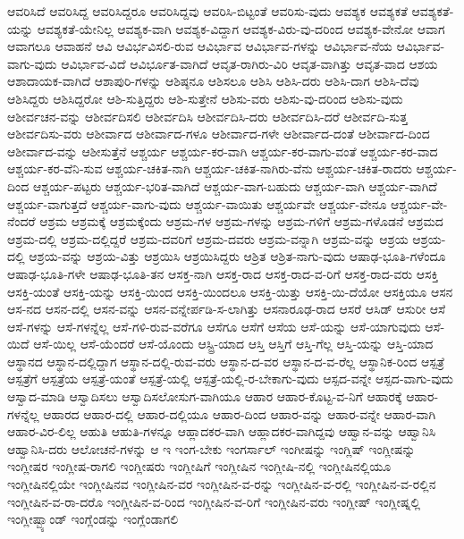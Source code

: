 {ಆವರಿಸಿದೆ
ಆವರಿಸಿದ್ದ
ಆವರಿಸಿದ್ದರೂ
ಆವರಿಸಿದ್ದವು
ಆವರಿಸಿ-ಬಿಟ್ಟಂತೆ
ಆವರಿಸು-ವುದು
ಆವಶ್ಯಕ
ಆವಶ್ಯಕತೆ
ಆವಶ್ಯಕತೆ-ಯನ್ನು
ಆವಶ್ಯಕತೆ-ಯೇನಿಲ್ಲ
ಆವಶ್ಯಕ-ವಾಗಿ
ಆವಶ್ಯಕ-ವಿದ್ದಾಗ
ಆವಶ್ಯಕ-ವಿರು-ವು-ದರಿಂದ
ಆವಶ್ಯಕ-ವೇನೋ
ಆವಾಗ
ಆವಾಗಲೂ
ಆವಾಹನೆ
ಆವಿ
ಆವಿರ್ಭವಿಸಲಿ-ರುವ
ಆವಿರ್ಭಾವ
ಆವಿರ್ಭಾವ-ಗಳನ್ನು
ಆವಿರ್ಭಾವ-ನೆಯ
ಆವಿರ್ಭಾವ-ವಾಗು-ವುದು
ಆವಿರ್ಭಾವ-ವಿದೆ
ಆವಿರ್ಭೂತ-ವಾಗಿದೆ
ಆವೃತ-ರಾಗಿರು-ವಿರಿ
ಆವೃತ-ವಾಗಿತ್ತು
ಆವೃತ-ವಾದ
ಆಶಯ
ಆಶಾದಾಯಕ-ವಾಗಿದೆ
ಆಶಾಪುರಿ-ಗಳನ್ನು
ಆಶಿಷ್ಠನೂ
ಆಶಿಸಲೂ
ಆಶಿಸಿ
ಆಶಿಸಿ-ದರು
ಆಶಿಸಿ-ದಾಗ
ಆಶಿಸಿ-ದೆವು
ಆಶಿಸಿದ್ದರು
ಆಶಿಸಿದ್ದರೋ
ಆಶಿ-ಸುತ್ತಿದ್ದರು
ಆಶಿ-ಸುತ್ತೇನೆ
ಆಶಿಸು-ವರು
ಆಶಿಸು-ವು-ದರಿಂದ
ಆಶಿಸು-ವುದು
ಆಶೀರ್ವಚನ-ವನ್ನು
ಆಶೀರ್ವದಿಸಲಿ
ಆಶೀರ್ವದಿಸಿ
ಆಶೀರ್ವದಿಸಿ-ದರು
ಆಶೀರ್ವದಿಸಿ-ದರೆ
ಆಶೀರ್ವದಿ-ಸುತ್ತ
ಆಶೀರ್ವದಿಸು-ವರು
ಆಶೀರ್ವಾದ
ಆಶೀರ್ವಾದ-ಗಳೂ
ಆಶೀರ್ವಾದ-ಗಳೇ
ಆಶೀರ್ವಾದ-ದಂತೆ
ಆಶೀರ್ವಾದ-ದಿಂದ
ಆಶೀರ್ವಾದ-ವನ್ನು
ಆಶೀಸುತ್ತೆನೆ
ಆಶ್ಚರ್ಯ
ಆಶ್ಚರ್ಯ-ಕರ-ವಾಗಿ
ಆಶ್ಚರ್ಯ-ಕರ-ವಾಗು-ವಂತೆ
ಆಶ್ಚರ್ಯ-ಕರ-ವಾದ
ಆಶ್ಚರ್ಯ-ಕರ-ವೆನಿ-ಸುವ
ಆಶ್ಚರ್ಯ-ಚಕಿತ-ನಾಗಿ
ಆಶ್ಚರ್ಯ-ಚಕಿತ-ನಾಗಿರು-ವೆನು
ಆಶ್ಚರ್ಯ-ಚಕಿತ-ರಾದರು
ಆಶ್ಚರ್ಯ-ದಿಂದ
ಆಶ್ಚರ್ಯ-ಪಟ್ಟರು
ಆಶ್ಚರ್ಯ-ಭರಿತ-ವಾಗಿದೆ
ಆಶ್ಚರ್ಯ-ವಾಗ-ಬಹುದು
ಆಶ್ಚರ್ಯ-ವಾಗಿ
ಆಶ್ಚರ್ಯ-ವಾಗಿದೆ
ಆಶ್ಚರ್ಯ-ವಾಗುತ್ತದೆ
ಆಶ್ಚರ್ಯ-ವಾಗು-ವುದು
ಆಶ್ಚರ್ಯ-ವಾಯಿತು
ಆಶ್ಚರ್ಯವೇ
ಆಶ್ಚರ್ಯ-ವೇನೂ
ಆಶ್ಚರ್ಯ-ವೇ-ನೆಂದರೆ
ಆಶ್ರಮ
ಆಶ್ರಮಕ್ಕೆ
ಆಶ್ರಮಕ್ಕೆಂದು
ಆಶ್ರಮ-ಗಳ
ಆಶ್ರಮ-ಗಳನ್ನು
ಆಶ್ರಮ-ಗಳಿಗೆ
ಆಶ್ರಮ-ಗಳೊಡನೆ
ಆಶ್ರಮದ
ಆಶ್ರಮ-ದಲ್ಲಿ
ಆಶ್ರಮ-ದಲ್ಲಿದ್ದರೆ
ಆಶ್ರಮ-ದವರಿಗೆ
ಆಶ್ರಮ-ದವರು
ಆಶ್ರಮ-ವನ್ನಾಗಿ
ಆಶ್ರಮ-ವನ್ನು
ಆಶ್ರಯ
ಆಶ್ರಯ-ದಲ್ಲಿ
ಆಶ್ರಯ-ವನ್ನು
ಆಶ್ರಯ-ವಿತ್ತು
ಆಶ್ರಯಿಸಿ
ಆಶ್ರಯಿಸಿದ್ದರು
ಆಶ್ರಿತ
ಆಶ್ರಿತ-ನಾಗು-ವುದು
ಆಷಾಢ-ಭೂತಿ-ಗಳೆಂದೂ
ಆಷಾಢ-ಭೂತಿ-ಗಳೇ
ಆಷಾಢ-ಭೂತಿ-ತನ
ಆಸಕ್ತ-ನಾಗಿ
ಆಸಕ್ತ-ರಾದ
ಆಸಕ್ತ-ರಾದ-ವ-ರಿಗೆ
ಆಸಕ್ತ-ರಾದ-ವರು
ಆಸಕ್ತಿ
ಆಸಕ್ತಿ-ಯಂತೆ
ಆಸಕ್ತಿ-ಯನ್ನು
ಆಸಕ್ತಿ-ಯಿಂದ
ಆಸಕ್ತಿ-ಯಿಂದಲೂ
ಆಸಕ್ತಿ-ಯಿತ್ತು
ಆಸಕ್ತಿ-ಯಿ-ದೆಯೋ
ಆಸಕ್ತಿಯೂ
ಆಸನ
ಆಸ-ನದ
ಆಸನ-ದಲ್ಲಿ
ಆಸನ-ವನ್ನು
ಆಸನ-ವನ್ನೇರ್ಪಡಿ-ಸ-ಲಾಗಿತ್ತು
ಆಸನಾರೂಢ-ರಾದ
ಆಸರೆ
ಆಸಿಡ್
ಆಸುರೀ
ಆಸೆ
ಆಸೆ-ಗಳನ್ನು
ಆಸೆ-ಗಳನ್ನೆಲ್ಲ
ಆಸೆ-ಗಳಿ-ರುವ-ವರೆಗೂ
ಆಸೆಗೂ
ಆಸೆಗೆ
ಆಸೆಯ
ಆಸೆ-ಯನ್ನು
ಆಸೆ-ಯಾಗುವುದು
ಆಸೆ-ಯಿದೆ
ಆಸೆ-ಯಿಲ್ಲ
ಆಸೆ-ಯೆಂದರೆ
ಆಸೆ-ಯೊಂದು
ಆಸ್ಟ್ರಿ-ಯಾದ
ಆಸ್ತಿ
ಆಸ್ತಿಗೆ
ಆಸ್ತಿ-ಗೆಲ್ಲ
ಆಸ್ತಿ-ಯನ್ನು
ಆಸ್ತಿ-ಯಾದ
ಆಸ್ಥಾನದ
ಆಸ್ಥಾನ-ದಲ್ಲಿದ್ದಾಗ
ಆಸ್ಥಾನ-ದಲ್ಲಿ-ರುವ-ವರು
ಆಸ್ಥಾನ-ದ-ವರ
ಆಸ್ಥಾನ-ದ-ವ-ರೆಲ್ಲ
ಆಸ್ಥಾನಿಕ-ರಿಂದ
ಆಸ್ಪತ್ರೆ
ಆಸ್ಪತ್ರೆಗೆ
ಆಸ್ಪತ್ರೆಯ
ಆಸ್ಪತ್ರೆ-ಯಂತೆ
ಆಸ್ಪತ್ರೆ-ಯಲ್ಲಿ
ಆಸ್ಪತ್ರೆ-ಯಲ್ಲಿ-ರ-ಬೇಕಾಗು-ವುದು
ಆಸ್ಪದ-ವನ್ನೇ
ಆಸ್ಪದ-ವಾಗು-ವುದು
ಆಸ್ವಾದ-ಮಾಡಿ
ಆಸ್ವಾದಿಸಲು
ಆಸ್ವಾದಿಸಲೋಸುಗ-ವಾಗಿಯೂ
ಆಹಾರ
ಆಹಾರ-ಕೊಟ್ಟ-ವ-ನಿಗೆ
ಆಹಾರಕ್ಕೆ
ಆಹಾರ-ಗಳನ್ನೆಲ್ಲ
ಆಹಾರದ
ಆಹಾರ-ದಲ್ಲಿ
ಆಹಾರ-ದಲ್ಲಿಯೂ
ಆಹಾರ-ದಿಂದ
ಆಹಾರ-ವನ್ನು
ಆಹಾರ-ವನ್ನೇ
ಆಹಾರ-ವಾಗಿ
ಆಹಾರ-ವಿರ-ಲಿಲ್ಲ
ಆಹುತಿ
ಆಹುತಿ-ಗಳನ್ನೂ
ಆಹ್ಲಾದಕರ-ವಾಗಿ
ಆಹ್ಲಾದಕರ-ವಾಗಿದ್ದವು
ಆಹ್ವಾನ-ವನ್ನು
ಆಹ್ವಾನಿಸಿ
ಆಹ್ವಾನಿಸಿ-ದರು
ಆಲೋಚನೆ-ಗಳನ್ನು
ಆ
ಇ
ಇಂಗ-ಬೇಕು
ಇಂಗರ್ಸಾಲ್
ಇಂಗೀಷನ್ನು
ಇಂಗ್ಲಿಷ್
ಇಂಗ್ಲೀಷನ್ನು
ಇಂಗ್ಲೀಷರ
ಇಂಗ್ಲೀಷ-ರಾಗಲಿ
ಇಂಗ್ಲೀಷರು
ಇಂಗ್ಲೀಷಿಗೆ
ಇಂಗ್ಲೀಷಿನ
ಇಂಗ್ಲೀಷಿ-ನಲ್ಲಿ
ಇಂಗ್ಲೀಷಿನಲ್ಲಿಯೂ
ಇಂಗ್ಲೀಷಿನಲ್ಲಿಯೇ
ಇಂಗ್ಲೀಷಿನವ
ಇಂಗ್ಲೀಷಿನ-ವರ
ಇಂಗ್ಲೀಷಿನ-ವ-ರನ್ನು
ಇಂಗ್ಲೀಷಿನ-ವ-ರಲ್ಲಿ
ಇಂಗ್ಲೀಷಿನ-ವ-ರಲ್ಲಿನ
ಇಂಗ್ಲೀಷಿನ-ವ-ರಾ-ದರೊ
ಇಂಗ್ಲೀಷಿನ-ವ-ರಿಂದ
ಇಂಗ್ಲೀಷಿನ-ವ-ರಿಗೆ
ಇಂಗ್ಲೀಷಿನ-ವರು
ಇಂಗ್ಲೀಷ್
ಇಂಗ್ಲೀಷ್ನಲ್ಲಿ
ಇಂಗ್ಲೀಷ್ಬ್ಯಾಂಡ್
ಇಂಗ್ಲೆಂಡನ್ನು
ಇಂಗ್ಲೆಂಡಾಗಲಿ
}
